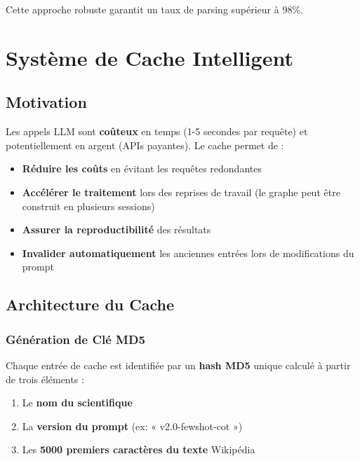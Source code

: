 \documentclass[12pt,a4paper]{report}
\begin{document}
Cette approche robuste garantit un taux de parsing supérieur à 98\%.

\chapter{Système de Cache Intelligent}

\section{Motivation}

Les appels LLM sont \textbf{coûteux} en temps (1-5 secondes par requête) et potentiellement en argent (APIs payantes). Le cache permet de :

\begin{itemize}
    \item \textbf{Réduire les coûts} en évitant les requêtes redondantes
    \item \textbf{Accélérer le traitement} lors des reprises de travail (le graphe peut être construit en plusieurs sessions)
    \item \textbf{Assurer la reproductibilité} des résultats
    \item \textbf{Invalider automatiquement} les anciennes entrées lors de modifications du prompt
\end{itemize}

\section{Architecture du Cache}

\subsection{Génération de Clé MD5}

Chaque entrée de cache est identifiée par un \textbf{hash MD5} unique calculé à partir de trois éléments :

\begin{enumerate}
    \item Le \textbf{nom du scientifique}
    \item La \textbf{version du prompt} (ex: « v2.0-fewshot-cot »)
    \item Les \textbf{5000 premiers caractères du texte} Wikipédia
\end{enumerate}
\end{document}
